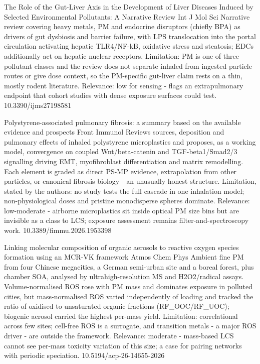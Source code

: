 \documentclass[10pt]{article}
\begin{document}
{The Role of the Gut-Liver Axis in the Development of Liver Diseases Induced by Selected Environmental Pollutants: A Narrative Review}
{Int J Mol Sci}
{Narrative review covering heavy metals, PM and endocrine disruptors (chiefly BPA) as drivers of gut dysbiosis and barrier failure, with LPS translocation into the portal circulation activating hepatic TLR4/NF-kB, oxidative stress and steatosis; EDCs additionally act on hepatic nuclear receptors. Limitation: PM is one of three pollutant classes and the review does not separate inhaled from ingested particle routes or give dose context, so the PM-specific gut-liver claim rests on a thin, mostly rodent literature. Relevance: low for sensing - flags an extrapulmonary endpoint that cohort studies with dense exposure surfaces could test.}
{10.3390/ijms27198581}

{Polystyrene-associated pulmonary fibrosis: a summary based on the available evidence and prospects}
{Front Immunol}
{Reviews sources, deposition and pulmonary effects of inhaled polystyrene microplastics and proposes, as a working model, convergence on coupled Wnt/beta-catenin and TGF-beta1/Smad2/3 signalling driving EMT, myofibroblast differentiation and matrix remodelling. Each element is graded as direct PS-MP evidence, extrapolation from other particles, or canonical fibrosis biology - an unusually honest structure. Limitation, stated by the authors: no study tests the full cascade in one inhalation model; non-physiological doses and pristine monodisperse spheres dominate. Relevance: low-moderate - airborne microplastics sit inside optical PM size bins but are invisible as a class to LCS; exposure assessment remains filter-and-spectroscopy work.}
{10.3389/fimmu.2026.1953398}

\par{}\baselineskip{}\baselineskip
{}

{Linking molecular composition of organic aerosols to reactive oxygen species formation using an MCR-VK framework}
{Atmos Chem Phys}
{Ambient fine PM from four Chinese megacities, a German semi-urban site and a boreal forest, plus chamber SOA, analysed by ultrahigh-resolution MS and H2O2/radical assays. Volume-normalised ROS rose with PM mass and dominates exposure in polluted cities, but mass-normalised ROS varied independently of loading and tracked the ratio of oxidised to unsaturated organic fractions (RF\_OOC/RF\_UOC); biogenic aerosol carried the highest per-mass yield. Limitation: correlational across few sites; cell-free ROS is a surrogate, and transition metals - a major ROS driver - are outside the framework. Relevance: moderate - mass-based LCS cannot see per-mass toxicity variation of this size; a case for pairing networks with periodic speciation.}
{10.5194/acp-26-14655-2026}
\end{document}
